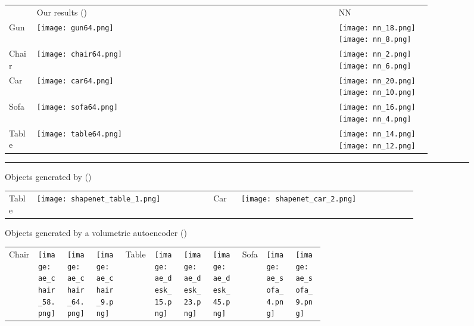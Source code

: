 \documentclass{article}
\begin{document}
\begin{figure}[t]
\centering

{
\renewcommand{\arraystretch}{0}
\begin{tabular}{L{0.06\linewidth}C{0.65\linewidth}|C{0.20\linewidth}}
& Our results () & NN\\
Gun&
\texttt{[image: gun64.png]}&
\texttt{[image: nn\_18.png]}
\texttt{[image: nn\_8.png]}\\
Chair&
\texttt{[image: chair64.png]}&
\texttt{[image: nn\_2.png]}
\texttt{[image: nn\_6.png]}\\
Car&
\texttt{[image: car64.png]}&
\texttt{[image: nn\_20.png]}
\texttt{[image: nn\_10.png]}\\
Sofa&
\texttt{[image: sofa64.png]}&
\texttt{[image: nn\_16.png]}
\texttt{[image: nn\_4.png]}\\
Table&
\texttt{[image: table64.png]}&
\texttt{[image: nn\_14.png]}
\texttt{[image: nn\_12.png]}
\end{tabular}
}

\hrule
\vspace{5pt}

Objects generated by \cite{wu20153d} ()
\begin{tabular}{L{0.06\linewidth}C{0.38\linewidth}R{0.06\linewidth}C{0.38\linewidth}}
Table&
\texttt{[image: shapenet\_table\_1.png]}&
Car&
\texttt{[image: shapenet\_car\_2.png]}\\
\end{tabular}

\vspace{3pt}
Objects generated by a volumetric autoencoder ()
\vspace{3pt}

\begin{tabular}{L{0.06\linewidth}C{0.064\linewidth}C{0.064\linewidth}C{0.064\linewidth}L{0.06\linewidth}C{0.064\linewidth}C{0.064\linewidth}C{0.064\linewidth}L{0.05\linewidth}C{0.064\linewidth}C{0.064\linewidth}}
Chair &
\texttt{[image: ae\_chair\_58.png]}&
\texttt{[image: ae\_chair\_64.png]}&
\texttt{[image: ae\_chair\_9.png]}&
Table &
\texttt{[image: ae\_desk\_15.png]}&
\texttt{[image: ae\_desk\_23.png]}&
\texttt{[image: ae\_desk\_45.png]}&
Sofa &
\texttt{[image: ae\_sofa\_4.png]}&
\texttt{[image: ae\_sofa\_9.png]}
\end{tabular}
\vspace{-8pt}


\end{figure}
\end{document}
